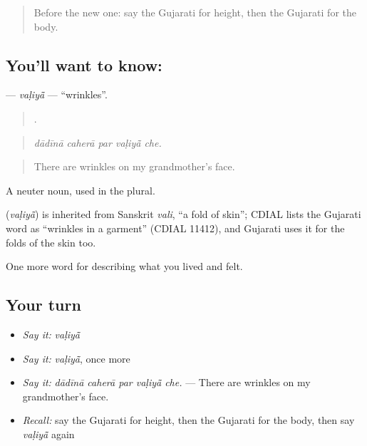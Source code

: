 \label{lesson:GU-C471-valiya}



\begin{quote}
Before the new one: say the Gujarati for height, then the Gujarati for the body.
\end{quote}

\subsection*{You'll want to know: }
\textbf{} — \emph{vaḷiyā̃} — \textquotedblleft{}wrinkles\textquotedblright{}.

\begin{quote}
    .
\end{quote}

\begin{quote}
\emph{dādīnā caherā par vaḷiyā̃ che.}
\end{quote}

\begin{quote}
There are wrinkles on my grandmother's face.
\end{quote}

A neuter noun, used in the plural.

\begin{cousinweb}
\textbf{} (\emph{vaḷiyā̃}) is inherited from Sanskrit \emph{vali}, \textquotedblleft{}a fold of skin\textquotedblright{}; CDIAL lists the Gujarati word as \textquotedblleft{}wrinkles in a garment\textquotedblright{} (CDIAL 11412), and Gujarati uses it for the folds of the skin too.
\end{cousinweb}

\begin{grammarlens}[title={What you've built}]
One more word for describing what you lived and felt.
\end{grammarlens}

\subsection*{Your turn}
\begin{itemize}
\raggedright
  \item \emph{Say it:} \emph{vaḷiyā̃}
  \item \emph{Say it:} \emph{vaḷiyā̃}, once more
  \item \emph{Say it:} \emph{dādīnā caherā par vaḷiyā̃ che.} — There are wrinkles on my grandmother's face.
  \item \emph{Recall:} say the Gujarati for height, then the Gujarati for the body, then say \emph{vaḷiyā̃} again
\end{itemize}

